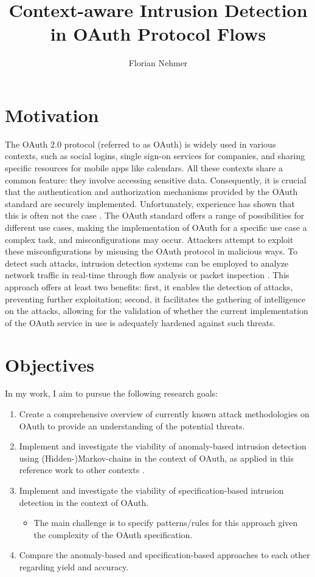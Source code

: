 \documentclass{article}
\title{Context-aware Intrusion Detection in OAuth Protocol Flows}
\author{Florian Nehmer}
\begin{document}
\maketitle

\section{Motivation}
The OAuth 2.0 protocol \cite{rfc6749} (referred to as OAuth) is widely used in various contexts, such as social logins, single sign-on services for companies, and sharing specific resources for mobile apps like calendars. All these contexts share a common feature: they involve accessing sensitive data. Consequently, it is crucial that the authentication and authorization mechanisms provided by the OAuth standard are securely implemented. Unfortunately, experience has shown that this is often not the case \cite{Li2019}. The OAuth standard offers a range of possibilities for different use cases, making the implementation of OAuth for a specific use case a complex task, and misconfigurations may occur. Attackers attempt to exploit these misconfigurations by misusing the OAuth protocol in malicious ways. To detect such attacks, intrusion detection systems can be employed to analyze network traffic in real-time through flow analysis or packet inspection \cite{Liu2019}. This approach offers at least two benefits: first, it enables the detection of attacks, preventing further exploitation; second, it facilitates the gathering of intelligence on the attacks, allowing for the validation of whether the current implementation of the OAuth service in use is adequately hardened against such threats.

\section{Objectives}
In my work, I aim to pursue the following research goals:

\begin{enumerate}
    \item Create a comprehensive overview of currently known attack methodologies on OAuth to provide an understanding of the potential threats.
    \item Implement and investigate the viability of anomaly-based intrusion detection using (Hidden-)Markov-chains in the context of OAuth, as applied in this reference work to other contexts \cite{sperotto2011}.
    \item Implement and investigate the viability of specification-based intrusion detection in the context of OAuth.
    \begin{itemize}
        \item The main challenge is to specify patterns/rules for this approach given the complexity of the OAuth specification.
    \end{itemize}
    \item Compare the anomaly-based and specification-based approaches to each other regarding yield and accuracy.
\end{enumerate}
\end{document}
